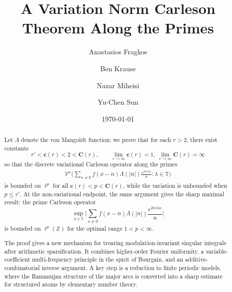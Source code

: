 \documentclass[12pt]{amsart}
\numberwithin{equation}{section}
\theoremstyle{definition}
\begin{document}
 
\title{A Variation Norm Carleson Theorem Along the Primes}
 


\author{Anastasios Fragkos}
\address{
Department of Mathematics,
Georgia Tech \\
686 Cherry Street, Atlanta, GA 30332-0160 USA}


\author{Ben Krause}
\address{
Department of Mathematics,
University of Bristol \\
Beacon House, Queens Rd, Bristol BS8 1QU}

\author{Nazar Miheisi}
\address{
Department of Mathematics,
King's College London \\
Strand Building, Strand Campus, Strand, London, WC2R 2LS}



\author{Yu-Chen Sun}
\address{
Department of Mathematics,
University of Bristol \\
Beacon House, Queens Rd, Bristol BS8 1QU}
 
\date{\today}
 
\begin{abstract}
Let $\Lambda$ denote the von Mangoldt function; we prove that for each $r > 2$, there exist constants
\[ r' < \mathbf{c}(r) < 2 < \mathbf{C}(r), \qquad \lim_{r \to \infty} \mathbf{c}(r) = 1, \ \lim_{r \to \infty} \mathbf{C}(r) = \infty \]
so that the discrete variational Carleson operator along the primes
\begin{align}
\mathcal{V}^r \Big( \sum_{n \neq 0} f(x-n) \Lambda(|n|)  \frac{e^{2\pi i \lambda n}}{n} : \lambda \in \mathbb{T} \Big)
\end{align}
is bounded on $\ell^p$ for all $\mathbf{c}(r)  < p < \mathbf{C}(r)$, while the variation is unbounded when $p \leq r'$.
At the non-variational endpoint, the same argument gives
the sharp maximal result: the prime Carleson operator
\[
\sup_{\lambda\in\mathbb T}
\Big|\sum_{n\neq0} f(x-n)\Lambda(|n|)\frac{e^{2\pi i\lambda n}}{n}\Big|
\]
is bounded on $\ell^p(\mathbb Z)$ for the optimal range $1<p<\infty$.


The proof gives a new mechanism for treating modulation-invariant singular
integrals after arithmetic sparsification.  It combines higher-order Fourier
uniformity, a variable-coefficient multi-frequency principle in the spirit of
Bourgain, and an additive-combinatorial inverse argument.  A key step is a
reduction to finite periodic models, where the Ramanujan structure of the major
arcs is converted into a sharp estimate for structured atoms by elementary
number theory.
\end{abstract}
 
\end{document}
